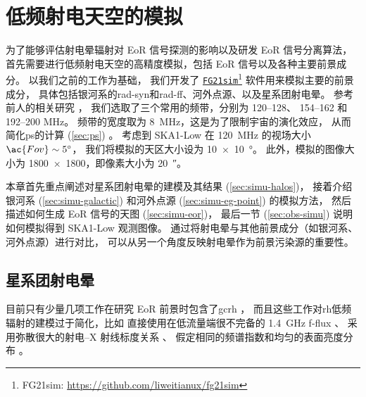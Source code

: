

\chapter{低频射电天空的模拟}
\label{chap:simulation}

为了能够评估射电晕辐射对 EoR 信号探测的影响以及研发 EoR 信号分离算法，
首先需要进行低频射电天空的高精度模拟，包括 EoR 信号以及各种主要前景成分。
以我们之前的工作\cite{wang2010,wang2013}为基础，
我们开发了
\href{https://github.com/liweitianux/fg21sim}{\texttt{FG21sim}}\footnote{%
  FG21sim: \url{https://github.com/liweitianux/fg21sim}}
软件用来模拟主要的前景成分，
具体包括银河系的\ac{rad-syn}和\ac{rad-ff}、河外点源、以及星系团射电晕。
参考前人的相关研究 \cite{liu2009ps,datta2010,chapman2012,sims2016}，
我们选取了三个常用的频带，分别为 \numrange{120}{128}、
\numrange{154}{162} 和 \numrange{192}{200} \si{\MHz}。
频带的宽度取为 \SI{8}{\MHz}，这是为了限制宇宙的演化效应，
从而简化\ac{ps}的计算 (\autoref{sec:ps}) \cite{wyithe2004,thyagarajan2013}。
考虑到 SKA1-Low 在 \SI{120}{\MHz} 的视场大小 $\ac{Fov} \sim \SI{5}{\degree}$，
我们将模拟的天区大小设为 \SI{10 x 10}{\degree}。
此外，模拟的图像大小为 \num{1800 x 1800}，即像素大小为 \SI{20}{\arcsecond}。

本章首先重点阐述对星系团射电晕的建模及其结果 (\autoref{sec:simu-halos})，
接着介绍银河系 (\autoref{sec:simu-galactic})
和河外点源 (\autoref{sec:simu-eg-point}) 的模拟方法，
然后描述如何生成 EoR 信号的天图 (\autoref{sec:simu-eor})，
最后一节 (\autoref{sec:obs-simu}) 说明如何模拟得到 SKA1-Low 观测图像。
通过将射电晕与其他前景成分（如银河系、河外点源）进行对比，
可以从另一个角度反映射电晕作为前景污染源的重要性。


\section{星系团射电晕}
\label{sec:simu-halos}

目前只有少量几项工作在研究 EoR 前景时包含了\ac{gc}\ac{rh}
\cite{diMatteo2004,gleser2008,jelic2008}，
而且这些工作对\ac{rh}低频辐射的建模过于简化，比如
直接使用在低流量端很不完备的 \SI{1.4}{\GHz} \ac{f-flux} \cite{gleser2008}、
采用弥散很大的射电--X 射线标度关系 \cite{jelic2008}、
假定相同的频谱指数和均匀的表面亮度分布 \cite{gleser2008,jelic2008}。

